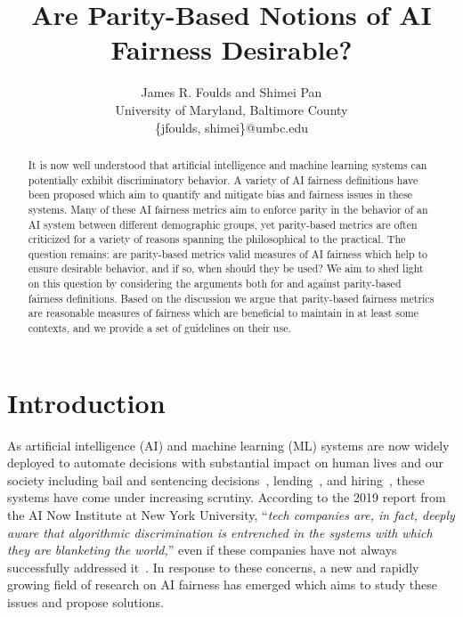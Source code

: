 \documentclass[11pt,dvipdfm]{article}
\begin{document}
\title{Are Parity-Based Notions of AI Fairness Desirable?}
\author{James R. Foulds and Shimei Pan\\ 
University of Maryland, Baltimore County\\ 
\{jfoulds, shimei\}@umbc.edu}


\maketitle
\begin{abstract}
It is now well understood that artificial intelligence and machine learning systems can potentially exhibit discriminatory behavior.  A variety of AI fairness definitions have been proposed which aim to quantify and mitigate bias and fairness issues in these systems.  Many of these AI fairness metrics aim to enforce parity in the behavior of an AI system between different demographic groups, yet parity-based metrics are often criticized for a variety of reasons spanning the philosophical to the practical.  The question remains: are parity-based metrics valid measures of AI fairness which help to ensure desirable behavior, and if so, when should they be used?  We aim to shed light on this question by considering the arguments both for and against parity-based fairness definitions.  Based on the discussion we argue that parity-based fairness metrics are reasonable measures of fairness which are beneficial to maintain in at least some contexts, and we provide a set of guidelines on their use.
\end{abstract}

\section{Introduction}
As artificial intelligence (AI) and machine learning (ML) systems are now widely deployed to automate decisions with substantial impact on human lives and our society including bail and sentencing decisions~\cite{angwin2016machine}, lending~\cite{applecard}, and hiring~\cite{dastin2018amazon}, these systems have come under increasing scrutiny.  According to the 2019 report from the AI Now Institute at New York University, ``\emph{tech companies are,
in fact, deeply aware that algorithmic discrimination is entrenched in the systems with which they are blanketing the world,}'' even if these companies have not always successfully addressed it~\cite{crawford2019ai}. In response to these concerns, a new and rapidly growing field of research on AI fairness has emerged which aims to study these issues and propose solutions.
\end{document}
